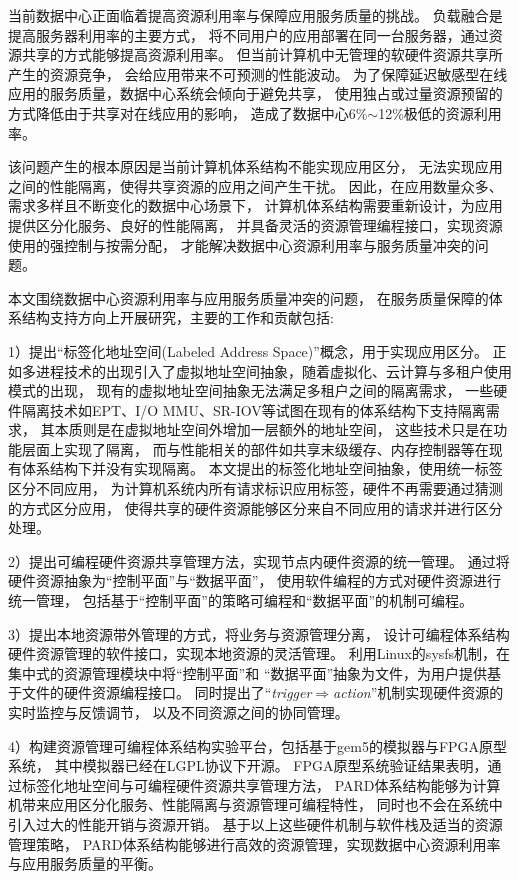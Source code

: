 \begin{cabstract}
  当前数据中心正面临着提高资源利用率与保障应用服务质量的挑战。
  负载融合是提高服务器利用率的主要方式，
  将不同用户的应用部署在同一台服务器，通过资源共享的方式能够提高资源利用率。
  但当前计算机中无管理的软硬件资源共享所产生的资源竞争，
  会给应用带来不可预测的性能波动。
  为了保障延迟敏感型在线应用的服务质量，数据中心系统会倾向于避免共享，
  使用独占或过量资源预留的方式降低由于共享对在线应用的影响，
  造成了数据中心6\%$\sim$12\%极低的资源利用率。

  该问题产生的根本原因是当前计算机体系结构不能实现应用区分，
  无法实现应用之间的性能隔离，使得共享资源的应用之间产生干扰。
  因此，在应用数量众多、需求多样且不断变化的数据中心场景下，
  计算机体系结构需要重新设计，为应用提供区分化服务、良好的性能隔离，
  并具备灵活的资源管理编程接口，实现资源使用的强控制与按需分配，
  才能解决数据中心资源利用率与服务质量冲突的问题。

  本文围绕数据中心资源利用率与应用服务质量冲突的问题，
  在服务质量保障的体系结构支持方向上开展研究，主要的工作和贡献包括:

  1）提出``标签化地址空间(Labeled Address Space)''概念，用于实现应用区分。
     正如多进程技术的出现引入了虚拟地址空间抽象，随着虚拟化、云计算与多租户使用模式的出现，
     现有的虚拟地址空间抽象无法满足多租户之间的隔离需求，
     一些硬件隔离技术如EPT、I/O MMU、SR-IOV等试图在现有的体系结构下支持隔离需求，
     其本质则是在虚拟地址空间外增加一层额外的地址空间，
     这些技术只是在功能层面上实现了隔离，
     而与性能相关的部件如共享末级缓存、内存控制器等在现有体系结构下并没有实现隔离。
     本文提出的标签化地址空间抽象，使用统一标签区分不同应用，
     为计算机系统内所有请求标识应用标签，硬件不再需要通过猜测的方式区分应用，
     使得共享的硬件资源能够区分来自不同应用的请求并进行区分处理。

  2）提出可编程硬件资源共享管理方法，实现节点内硬件资源的统一管理。
     通过将硬件资源抽象为``控制平面''与``数据平面''，
     使用软件编程的方式对硬件资源进行统一管理，
     包括基于``控制平面''的策略可编程和``数据平面''的机制可编程。

  3）提出本地资源带外管理的方式，将业务与资源管理分离，
     设计可编程体系结构硬件资源管理的软件接口，实现本地资源的灵活管理。
     利用Linux的sysfs机制，在集中式的资源管理模块中将``控制平面''和
     ``数据平面''抽象为文件，为用户提供基于文件的硬件资源编程接口。
     同时提出了``\emph{trigger$\Rightarrow$action}''机制实现硬件资源的实时监控与反馈调节，
     以及不同资源之间的协同管理。

  4）构建资源管理可编程体系结构实验平台，包括基于gem5的模拟器与FPGA原型系统，
     其中模拟器已经在LGPL协议下开源。
     FPGA原型系统验证结果表明，通过标签化地址空间与可编程硬件资源共享管理方法，
     PARD体系结构能够为计算机带来应用区分化服务、性能隔离与资源管理可编程特性，
     同时也不会在系统中引入过大的性能开销与资源开销。
     基于以上这些硬件机制与软件栈及适当的资源管理策略，
     PARD体系结构能够进行高效的资源管理，实现数据中心资源利用率与应用服务质量的平衡。
\end{cabstract}

